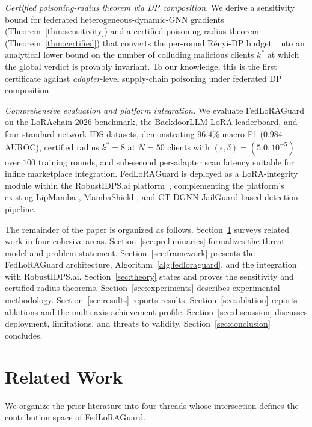 \documentclass[12pt,a4paper]{article}
\theoremstyle{definition}
\theoremstyle{remark}
\newcommand{\modelname}{FedLoRAGuard}
\newcommand{\benchname}{LoRAchain-2026}
\begin{document}
\textit{Certified poisoning-radius theorem via DP composition.} We derive a sensitivity bound for federated heterogeneous-dynamic-GNN gradients (Theorem~\ref{thm:sensitivity}) and a certified poisoning-radius theorem (Theorem~\ref{thm:certified}) that converts the per-round R\'enyi-DP budget~\cite{mironov2017renyi} into an analytical lower bound on the number of colluding malicious clients $k^*$ at which the global verdict is provably invariant. To our knowledge, this is the first certificate against \emph{adapter}-level supply-chain poisoning under federated DP composition.

\textit{Comprehensive evaluation and platform integration.} We evaluate \modelname{} on the \benchname{} benchmark, the BackdoorLLM-LoRA leaderboard, and four standard network IDS datasets, demonstrating $96.4\%$ macro-F1 ($0.984$ AUROC), certified radius $k^* = 8$ at $N = 50$ clients with $(\epsilon, \delta) = (5.0, 10^{-5})$ over $100$ training rounds, and sub-second per-adapter scan latency suitable for inline marketplace integration. \modelname{} is deployed as a LoRA-integrity module within the RobustIDPS.ai platform~\cite{anaedevha2026robustidps}, complementing the platform's existing LipMamba-, MambaShield-, and CT-DGNN-JailGuard-based detection pipeline.

The remainder of the paper is organized as follows. Section~\ref{sec:related} surveys related work in four cohesive areas. Section~\ref{sec:preliminaries} formalizes the threat model and problem statement. Section~\ref{sec:framework} presents the \modelname{} architecture, Algorithm~\ref{alg:fedloraguard}, and the integration with RobustIDPS.ai. Section~\ref{sec:theory} states and proves the sensitivity and certified-radius theorems. Section~\ref{sec:experiments} describes experimental methodology. Section~\ref{sec:results} reports results. Section~\ref{sec:ablation} reports ablations and the multi-axis achievement profile. Section~\ref{sec:discussion} discusses deployment, limitations, and threats to validity. Section~\ref{sec:conclusion} concludes.


\section{Related Work}
\label{sec:related}

We organize the prior literature into four threads whose intersection defines the contribution space of \modelname{}.
\end{document}
